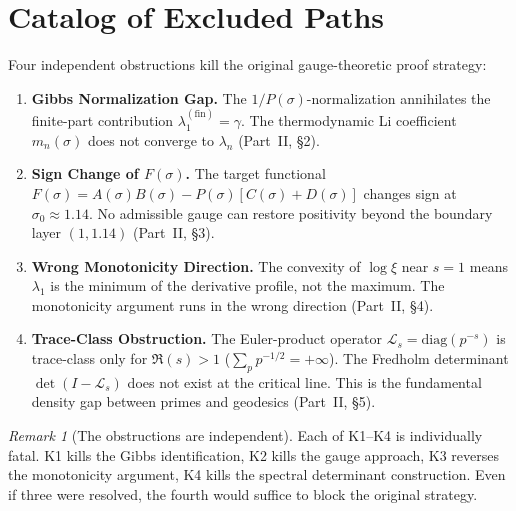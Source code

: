 \documentclass[12pt,a4paper]{article}
\theoremstyle{definition}
\theoremstyle{remark}
\newtheorem{remark}[theorem]{Remark}
\begin{document}
\section{Catalog of Excluded Paths}
\label{sec:excluded}

Four independent obstructions kill the original gauge-theoretic proof strategy:

\begin{enumerate}[label=\textbf{K\arabic*},leftmargin=3em]
  \item \textbf{Gibbs Normalization Gap.} The $1/P(\sigma)$-normalization annihilates the finite-part contribution $\lambda_1^{(\mathrm{fin})} = \gamma$. The thermodynamic Li coefficient $m_n(\sigma)$ does not converge to $\lambda_n$ (Part~II, \S2).

  \item \textbf{Sign Change of $F(\sigma)$.} The target functional $F(\sigma) = A(\sigma)B(\sigma) - P(\sigma)[C(\sigma) + D(\sigma)]$ changes sign at $\sigma_0 \approx 1.14$. No admissible gauge can restore positivity beyond the boundary layer $(1, 1.14)$ (Part~II, \S3).

  \item \textbf{Wrong Monotonicity Direction.} The convexity of $\log\xi$ near $s = 1$ means $\lambda_1$ is the minimum of the derivative profile, not the maximum. The monotonicity argument runs in the wrong direction (Part~II, \S4).

  \item \textbf{Trace-Class Obstruction.} The Euler-product operator $\mathcal{L}_s = \mathrm{diag}(p^{-s})$ is trace-class only for $\Re(s) > 1$ ($\sum_p p^{-1/2} = +\infty$). The Fredholm determinant $\det(I - \mathcal{L}_s)$ does not exist at the critical line. This is the fundamental density gap between primes and geodesics (Part~II, \S5).
\end{enumerate}

\begin{remark}[The obstructions are independent]
Each of K1--K4 is individually fatal. K1 kills the Gibbs identification, K2 kills the gauge approach, K3 reverses the monotonicity argument, K4 kills the spectral determinant construction. Even if three were resolved, the fourth would suffice to block the original strategy.
\end{remark}
\end{document}
